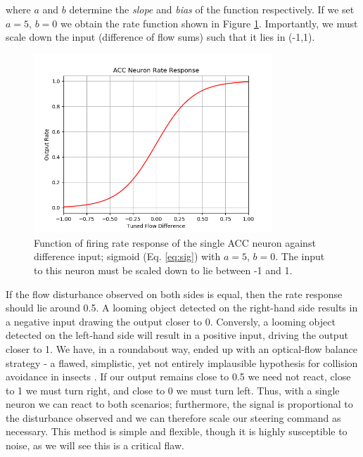 \documentclass[a4paper,11pt,twoside,openright]{article}
\begin{document}
where $a$ and $b$ determine the \textit{slope} and \textit{bias} of
the function respectively. If we set $a = 5$, $b = 0$ we obtain the
rate function shown in Figure \ref{fig:accrate}. Importantly, we must
scale down the input (difference of flow sums) such that it lies in
(-1,1).\newline\par

\begin{figure}[h!]
  \centering
  \includegraphics[width=0.8\textwidth]{ACCRate}
  \caption{\label{fig:accrate} Function of firing rate response of the
    single ACC neuron against difference input; sigmoid
    (Eq. \ref{eq:sig}) with $a = 5$, $b = 0$. The input to this neuron
    must be scaled down to lie between -1 and 1.}
\end{figure}

If the flow disturbance observed on both sides is equal, then the rate
response should lie around 0.5. A looming object detected on the
right-hand side results in a negative input drawing the output closer
to 0. Conversly, a looming object detected on the left-hand side will
result in a positive input, driving the output closer to 1. We have,
in a roundabout way, ended up with an optical-flow balance strategy -
a flawed, simplistic, yet not entirely implausible hypothesis for
collision avoidance in insects \cite{Julien2017}. If our output
remains close to 0.5 we need not react, close to 1 we must turn right,
and close to 0 we must turn left. Thus, with a single neuron we can
react to both scenarios; furthermore, the signal is proportional to
the disturbance observed and we can therefore scale our steering
command as necessary. This method is simple and flexible, though it is
highly susceptible to noise, as we will see this is a critical flaw.
\newline\par
\end{document}
